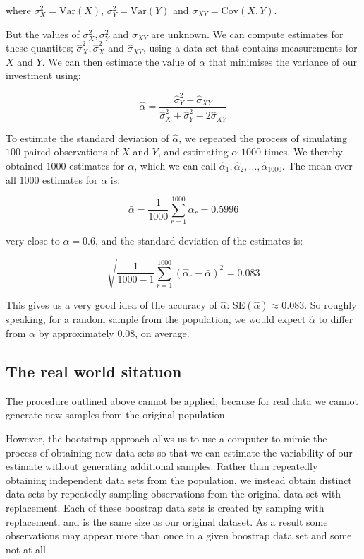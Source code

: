 \documentclass[twoside]{article}
\theoremstyle{definition}
\theoremstyle{definition}
\begin{document}
where $\sigma^2_X = \text{Var}(X)$, $\sigma^2_Y = \text{Var}(Y)$ and $\sigma_{XY} = \text{Cov}(X,Y)$. 

But the values of $\sigma^2_X,\sigma^2_Y$ and $\sigma_{XY}$ are unknown. We can compute estimates for these quantites; $\hat{\sigma}^2_{X}, \hat{\sigma}^2_{X}$ and  $\hat{\sigma}_{XY}$, using a data set that contains measurements for $X$ and $Y$. We can then estimate the value of $\alpha$ that minimises the variance of our investment using:

\begin{equation}
	\hat{\alpha} = \frac{\hat{\sigma}^2_Y - \hat{\sigma}_{XY}}{\hat{\sigma}^2_X + \hat{\sigma}^2_Y - 2\hat{\sigma}_{XY}} 
\end{equation}

To estimate the standard deviation of $\hat{\alpha}$, we repeated the process of simulating $100$ paired observations of $X$ and $Y$, and estimating $\alpha$ $1000$ times. We thereby obtained $1000$ estimates for $\alpha$, which we can call $\hat{\alpha}_1, \hat{\alpha}_2, \dots , \hat{\alpha}_{1000}$. The mean over all $1000$ estimates for $\alpha$ is:

\begin{equation}
	\bar{\alpha} = \frac{1}{1000} \sum_{r=1}^{1000} \hat{\alpha}_r = 0.5996
\end{equation}

very close to $\alpha = 0.6$, and the standard deviation of the estimates is: 

\begin{equation}
	\sqrt{\frac{1}{1000-1} \sum^{1000}_{r=1} (\hat{\alpha}_r - \bar{\alpha})^2} = 0.083
\end{equation}

This gives us a very good idea of the accuracy of $\hat{\alpha}$: $\text{SE}(\hat{\alpha}) \approx 0.083$. So roughly speaking, for a random sample from the population, we would expect $\hat{\alpha}$ to differ from $\alpha$ by approximately $0.08$, on average.

\subsection{The real world sitatuon}

The procedure outlined above cannot be applied, because for real data we cannot generate new samples from the original population.

However, the bootstrap approach allws us to use a computer to mimic the process of obtaining new data sets so that we can estimate the variability of our estimate without generating additional samples. Rather than repeatedly obtaining independent data sets from the population, we instead obtain distinct data sets by repeatedly sampling observations from the original data set with replacement.
Each of these boostrap data sets is created by samping with replacement, and is the same size as our original dataset. As a result some observations may appear more than once in a given boostrap data set and some not at all.
\end{document}
